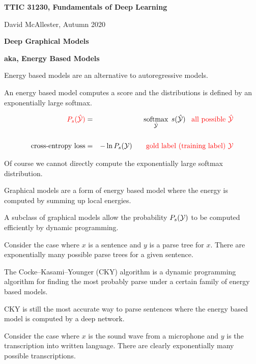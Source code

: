 




{\Huge

  \centerline{\bf TTIC 31230, Fundamentals of Deep Learning}
  \bigskip
  \centerline{David McAllester, Autumn 2020}
  \vfill
  \vfill
  \centerline{\bf Deep Graphical Models}
  \vfill
  \centerline{\bf aka, Energy Based Models}
\vfill
\vfill
\vfill


Energy based models are an alternative to autoregressive models.

\vfill
An energy based model computes a score and the distributions is defined by an exponentially large softmax.

\vfill
{\huge
\begin{eqnarray*}
{\color{red} P_s(\hat{{\cal Y}})} & = & \operatorname*{softmax}_{\hat{{\cal Y}}}\;s(\hat{{\cal Y}}) \;\;\;\mbox{\color{red} all possible $\hat{{\cal Y}}$} \\
\\
\mbox{cross-entropy loss} & = & - \ln P_s({\cal Y}) \;\;\;{\color{red} \;\;\;\;\mbox{gold label (training label) ${\cal Y}$}}
\end{eqnarray*}
}

\vfill
Of course we cannot directly compute the exponentially large softmax distribution.


Graphical models are a form of energy based model where the energy is computed by summing up local energies.

\vfill
A subclass of graphical models allow the probability $P_s({\cal Y})$ to be computed efficiently by dynamic programming.


Consider the case where $x$ is a sentence and $y$ is a parse tree for $x$.  There are exponentially many possible parse trees for a given sentence.

\vfill
The Cocke–Kasami–Younger (CKY) algorithm is a dynamic programming algorithm for finding the most probably parse under a certain family of energy based models.

\vfill
CKY is still the most accurate way to parse sentences where the energy based model is computed by a deep network.


Consider the case where $x$ is the sound wave from a microphone and $y$ is the transcription into written language.  There are clearly exponentially many
possible transcriptions.

}
